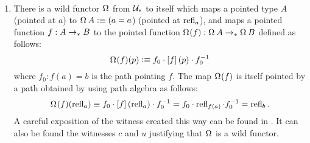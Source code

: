 \documentclass[english,a4paper]{lmcs}
\def\githubpath{\tt\small}
\begin{document}
\begin{exa}~\label{ex:loop-sus-wild-functors}%
  \begin{enumerate}
    \item There is a wild functor $\loopspace \null$ from $\mathcal{U}_*$ to itself
      which maps a pointed type $A$ (pointed at $a$) to $\loopspace \null A
      \defeq (a=a$) (pointed at $\mathop{{\mathrm{refl}}_{a}}$), and maps a pointed function $f: A
      \to_\ast B$ to the pointed function $\loopspace \null (f): \loopspace \null
      A \ptdto \loopspace \null B$ defined as follows:
      \begin{displaymath}
        \loopspace \null (f) (p) \defequi f_0 \cdot \ap f (p) \cdot \inv{f_0}
      \end{displaymath}
      where $f_0: f(a) = b$ is the path pointing $f$.
      The map $\loopspace \null (f)$ is itself pointed by a path obtained by
      using path algebra as follows:
      \begin{displaymath}
        \loopspace\null (f)(\refl a) \jdeq  f_0 \cdot \ap f (\refl a) \cdot \inv{f_0}
        = f_0 \cdot \refl {f(a)} \cdot \inv{f_0}
        = \refl b.
      \end{displaymath}
      A careful exposition of the witness created this way can be found in
      \cite[\githubpath core/lib/types/LoopSpace.agda]{hott-agda}. It can also
      be found the witnesses $c$ and $u$ justifying that $\loopspace \null$ is
      a wild functor.

\end{enumerate}
\end{exa}
\end{document}
